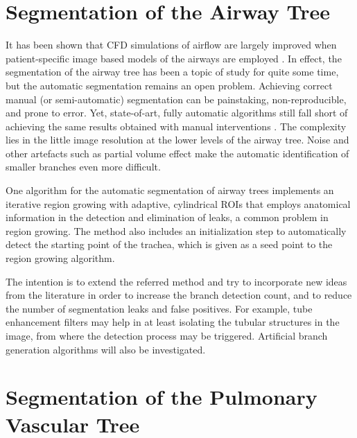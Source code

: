 \section{Segmentation of the Airway Tree}

\challenge

\begin{sloppypar}
It has been shown that CFD simulations of airflow are largely improved when patient-specific image based models of the airways are employed \citep{Tawhai2010,Vial2005}. In effect, the segmentation of the airway tree has been a topic of study for quite some time, but the automatic segmentation remains an open problem. Achieving correct manual (or semi-automatic) segmentation can be painstaking, non-reproducible, and prone to error. Yet, state-of-art, fully automatic algorithms still fall short of achieving the same results obtained with manual interventions \citep{Lo}. The complexity lies in the little image resolution at the lower levels of the airway tree. Noise and other artefacts such as partial volume effect make the automatic identification of smaller branches even more difficult.
\end{sloppypar}

\approach

\begin{sloppypar}
One algorithm for the automatic segmentation of airway trees \citep{Pinho:Airways2} implements an iterative region growing with adaptive, cylindrical ROIs that employs anatomical information in the detection and elimination of leaks, a common problem in region growing. The method also includes an initialization step to automatically detect the starting point of the trachea, which is given as a seed point to the region growing algorithm. 
\end{sloppypar}

The intention is to extend the referred method and try to incorporate new ideas from the literature \citep{Lo} in order to increase the branch detection count, and to reduce the number of segmentation leaks and false positives. For example, tube enhancement filters \citep{ORLO-09} may help in at least isolating the tubular structures in the image, from where the detection process may be triggered. Artificial branch generation algorithms \citep{Tawhai2000} will also be investigated.

\section{Segmentation of the Pulmonary Vascular Tree}


